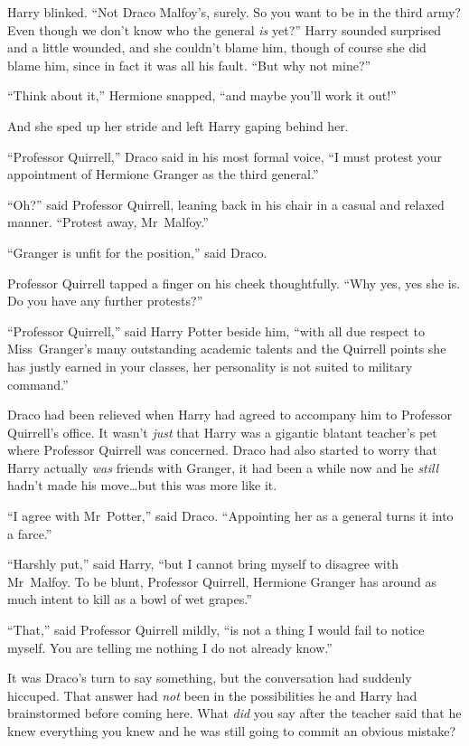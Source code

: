 Harry blinked.
“Not Draco Malfoy’s, surely. So you want to be in the third army? Even though we don’t know who the general \emph{is} yet?” Harry sounded surprised and a little wounded, and she couldn’t blame him, though of course she did blame him, since in fact it was all his fault.
“But why not mine?”

“Think about it,” Hermione snapped, “and maybe you’ll work it out!”

And she sped up her stride and left Harry gaping behind her.

\later

“Professor Quirrell,” Draco said in his most formal voice,
“I must protest your appointment of Hermione Granger as the third general.”

“Oh?” said Professor Quirrell, leaning back in his chair in a casual and relaxed manner.
“Protest away, Mr~Malfoy.”

“Granger is unfit for the position,” said Draco.

Professor Quirrell tapped a finger on his cheek thoughtfully.
“Why yes, yes she is. Do you have any further protests?”

“Professor Quirrell,” said Harry Potter beside him, “with all due respect to Miss~Granger’s many outstanding academic talents and the Quirrell points she has justly earned in your classes, her personality is not suited to military command.”

Draco had been relieved when Harry had agreed to accompany him to Professor Quirrell’s office. It wasn’t \emph{just} that Harry was a gigantic blatant teacher’s pet where Professor Quirrell was concerned. Draco had also started to worry that Harry actually \emph{was} friends with Granger, it had been a while now and he \emph{still} hadn’t made his move…but this was more like it.

“I agree with Mr~Potter,” said Draco.
“Appointing her as a general turns it into a farce.”

“Harshly put,” said Harry, “but I cannot bring myself to disagree with Mr~Malfoy. To be blunt, Professor Quirrell, Hermione Granger has around as much intent to kill as a bowl of wet grapes.”

“That,” said Professor Quirrell mildly, “is not a thing I would fail to notice myself. You are telling me nothing I do not already know.”

It was Draco’s turn to say something, but the conversation had suddenly hiccuped. That answer had \emph{not} been in the possibilities he and Harry had brainstormed before coming here. What \emph{did} you say after the teacher said that he knew everything you knew and he was still going to commit an obvious mistake?


